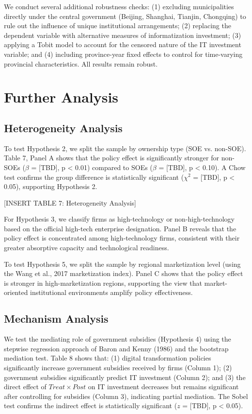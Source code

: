 \documentclass[12pt]{article}
\begin{document}
We conduct several additional robustness checks: (1) excluding municipalities directly under the central government (Beijing, Shanghai, Tianjin, Chongqing) to rule out the influence of unique institutional arrangements; (2) replacing the dependent variable with alternative measures of informatization investment; (3) applying a Tobit model to account for the censored nature of the IT investment variable; and (4) including province-year fixed effects to control for time-varying provincial characteristics. All results remain robust.

\section{Further Analysis}

\subsection{Heterogeneity Analysis}

To test Hypothesis 2, we split the sample by ownership type (SOE vs. non-SOE). Table 7, Panel A shows that the policy effect is significantly stronger for non-SOEs ($\beta$ = [TBD], p < 0.01) compared to SOEs ($\beta$ = [TBD], p < 0.10). A Chow test confirms the group difference is statistically significant ($\chi^2$ = [TBD], p < 0.05), supporting Hypothesis 2.

[INSERT TABLE 7: Heterogeneity Analysis]

For Hypothesis 3, we classify firms as high-technology or non-high-technology based on the official high-tech enterprise designation. Panel B reveals that the policy effect is concentrated among high-technology firms, consistent with their greater absorptive capacity and technological readiness.

To test Hypothesis 5, we split the sample by regional marketization level (using the Wang et al., 2017 marketization index). Panel C shows that the policy effect is stronger in high-marketization regions, supporting the view that market-oriented institutional environments amplify policy effectiveness.

\subsection{Mechanism Analysis}

We test the mediating role of government subsidies (Hypothesis 4) using the stepwise regression approach of Baron and Kenny (1986) and the bootstrap mediation test. Table 8 shows that: (1) digital transformation policies significantly increase government subsidies received by firms (Column 1); (2) government subsidies significantly predict IT investment (Column 2); and (3) the direct effect of $Treat \times Post$ on IT investment decreases but remains significant after controlling for subsidies (Column 3), indicating partial mediation. The Sobel test confirms the indirect effect is statistically significant ($z$ = [TBD], p < 0.05).
\end{document}
